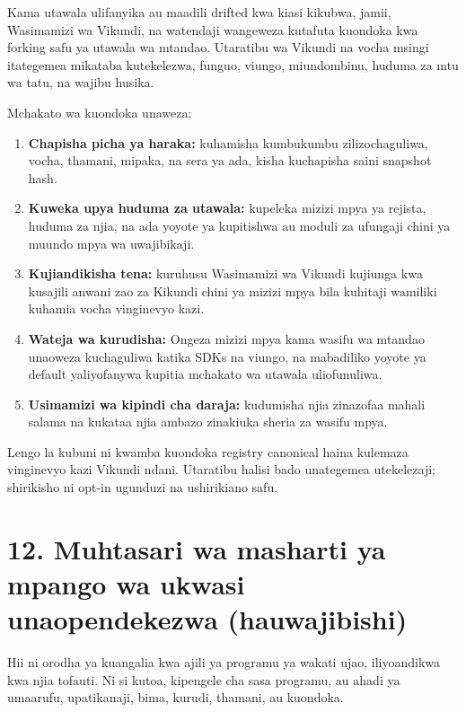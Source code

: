 \documentclass[11pt]{article}
\begin{document}
Kama utawala ulifanyika au maadili drifted kwa kiasi kikubwa, jamii, Wasimamizi wa Vikundi, na watendaji wangeweza kutafuta kuondoka kwa forking safu ya utawala wa mtandao. Utaratibu wa Vikundi na vocha msingi itategemea mikataba kutekelezwa, funguo, viungo, miundombinu, huduma za mtu wa tatu, na wajibu husika.

Mchakato wa kuondoka unaweza:

\begin{enumerate}[leftmargin=*]
\item \textbf{Chapisha picha ya haraka:} kuhamisha kumbukumbu zilizochaguliwa, vocha, thamani, mipaka, na sera ya ada, kisha kuchapisha saini snapshot hash.
\item \textbf{Kuweka upya huduma za utawala:} kupeleka mizizi mpya ya rejista, huduma za njia, na ada yoyote ya kupitishwa au moduli za ufungaji chini ya muundo mpya wa uwajibikaji.
\item \textbf{Kujiandikisha tena:} kuruhusu Wasimamizi wa Vikundi kujiunga kwa kusajili anwani zao za Kikundi chini ya mizizi mpya bila kuhitaji wamiliki kuhamia vocha vinginevyo kazi.
\item \textbf{Wateja wa kurudisha:} Ongeza mizizi mpya kama wasifu wa mtandao unaoweza kuchaguliwa katika SDKs na viungo, na mabadiliko yoyote ya default yaliyofanywa kupitia mchakato wa utawala uliofunuliwa.
\item \textbf{Usimamizi wa kipindi cha daraja:} kudumisha njia zinazofaa mahali salama na kukataa njia ambazo zinakiuka sheria za wasifu mpya.
\end{enumerate}
Lengo la kubuni ni kwamba kuondoka registry canonical haina kulemaza vinginevyo kazi Vikundi ndani. Utaratibu halisi bado unategemea utekelezaji; shirikisho ni opt-in ugunduzi na ushirikiano safu.


\section*{12. Muhtasari wa masharti ya mpango wa ukwasi unaopendekezwa (hauwajibishi)}

Hii ni orodha ya kuangalia kwa ajili ya programu ya wakati ujao, iliyoandikwa kwa njia tofauti. Ni si kutoa, kipengele cha sasa programu, au ahadi ya umaarufu, upatikanaji, bima, kurudi, thamani, au kuondoka.
\end{document}
